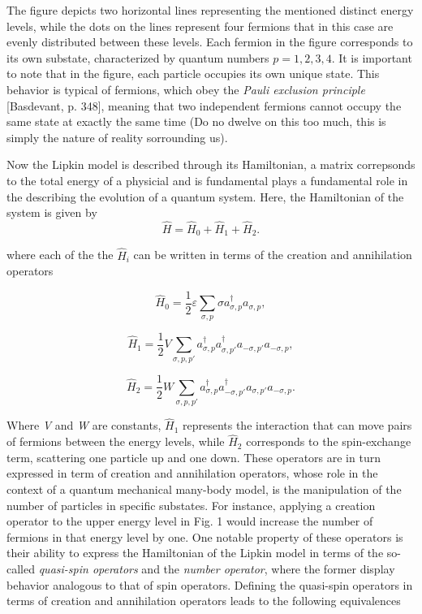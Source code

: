 \documentclass[onecolumn,10pt,cleanfoot]{asme2ej}
\begin{document}
The figure depicts two horizontal lines representing the mentioned distinct energy levels, while the dots on the lines represent four fermions that in this case are evenly distributed between these levels. Each fermion in the figure corresponds to its own substate, characterized by quantum numbers $p = 1, 2, 3, 4$. It is important to note that in the figure, each particle occupies its own unique state. This behavior is typical of fermions, which obey the \textit{Pauli exclusion principle} [Basdevant, p. 348], meaning that two independent fermions cannot occupy the same state at exactly the same time (Do no dwelve on this too much, this is simply the nature of reality sorrounding us).

Now the Lipkin model is described through its Hamiltonian, a matrix correpsonds to the total energy of a physicial and is fundamental plays a fundamental role in the describing the evolution of a quantum system. Here, the Hamiltonian of the system is given by 
\begin{equation}
\hat{H} = \hat{H}_{0} + \hat{H}_{1} + \hat{H}_{2}.
\end{equation}

where each of the the $\hat{H}_{i}$ can be written in terms of the creation and annihilation operators

\begin{equation}
\hat{H}_0 = \frac{1}{2}\varepsilon\sum_{\sigma,p}\sigma a_{\sigma,p}^{\dagger}a_{\sigma,p},
\end{equation}

\begin{equation}
\hat{H}_1 = \frac{1}{2}V\sum_{\sigma,p,p'} a_{\sigma,p}^{\dagger}a_{\sigma,p'}^{\dagger}a_{-\sigma,p'}a_{-\sigma,p},
\end{equation}

\begin{equation}
\hat{H}_2 = \frac{1}{2}W\sum_{\sigma,p,p'} a_{\sigma,p}^{\dagger}a_{-\sigma,p'}^{\dagger}a_{\sigma,p'}a_{-\sigma,p}.
\end{equation}

Where \textit{V} and \textit{W} are constants, $\hat{H}_1$ represents the interaction that can move pairs of fermions between the energy levels, while $\hat{H}_2$ corresponds to the spin-exchange term, scattering one particle up and one down. These operators are in turn expressed in term of creation and annihilation operators, whose role in the context of a quantum mechanical many-body model, is the manipulation of the number of particles in specific substates. For instance, applying a creation operator to the upper energy level in Fig. 1 would increase the number of fermions in that energy level by one. One notable property of these operators is their ability to express the Hamiltonian of the Lipkin model in terms of the so-called \textit{quasi-spin operators} and the \textit{number operator}, where the former display behavior analogous to that of spin operators. Defining the quasi-spin operators in terms of creation and annihilation operators leads to the following equivalences 
\end{document}
